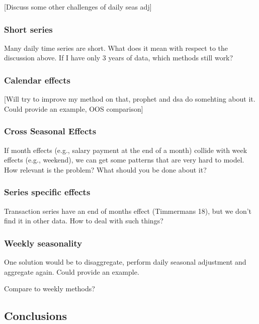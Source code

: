 \documentclass[
]{article}
\begin{document}
{[}Discuss some other challenges of daily seas adj{]}

\hypertarget{short-series}{%
\subsubsection{Short series}\label{short-series}}

Many daily time series are short. What does it mean with respect to the
discussion above. If I have only 3 years of data, which methods still
work?

\hypertarget{calendar-effects}{%
\subsubsection{Calendar effects}\label{calendar-effects}}

{[}Will try to improve my method on that, prophet and dsa do somehting
about it. Could provide an example, OOS comparison{]}

\hypertarget{cross-seasonal-effects}{%
\subsubsection{Cross Seasonal Effects}\label{cross-seasonal-effects}}

If month effects (e.g., salary payment at the end of a month) collide
with week effects (e.g., weekend), we can get some patterns that are
very hard to model. How relevant is the problem? What should you be done
about it?

\hypertarget{series-specific-effects}{%
\subsubsection{Series specific effects}\label{series-specific-effects}}

Transaction series have an end of months effect (Timmermans 18), but we
don't find it in other data. How to deal with such things?

\hypertarget{weekly-seasonality}{%
\subsubsection{Weekly seasonality}\label{weekly-seasonality}}

One solution would be to disaggregate, perform daily seasonal adjustment
and aggregate again. Could provide an example.

Compare to weekly methods?

\hypertarget{conclusions}{%
\subsection{Conclusions}\label{conclusions}}
\end{document}
